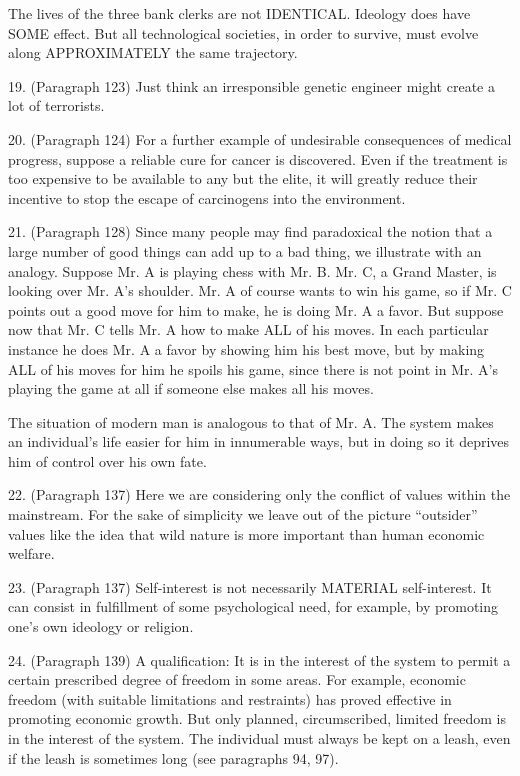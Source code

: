 The lives of the three bank clerks are not IDENTICAL. Ideology does have SOME effect. But all technological societies, in order to survive, must evolve along APPROXIMATELY the same trajectory.

19. (Paragraph 123) Just think an irresponsible genetic engineer might create a lot of terrorists.

20. (Paragraph 124) For a further example of undesirable consequences of medical progress, suppose a reliable cure for cancer is discovered. Even if the treatment is too expensive to be available to any but the elite, it will greatly reduce their incentive to stop the escape of carcinogens into the environment.

21. (Paragraph 128) Since many people may find paradoxical the notion that a large number of good things can add up to a bad thing, we illustrate with an analogy. Suppose Mr. A is playing chess with Mr. B. Mr. C, a Grand Master, is looking over Mr. A’s shoulder. Mr. A of course wants to win his game, so if Mr. C points out a good move for him to make, he is doing Mr. A a favor. But suppose now that Mr. C tells Mr. A how to make ALL of his moves. In each particular instance he does Mr. A a favor by showing him his best move, but by making ALL of his moves for him he spoils his game, since there is not point in Mr. A’s playing the game at all if someone else makes all his moves.

The situation of modern man is analogous to that of Mr. A. The system makes an individual’s life easier for him in innumerable ways, but in doing so it deprives him of control over his own fate.

22. (Paragraph 137) Here we are considering only the conflict of values within the mainstream. For the sake of simplicity we leave out of the picture “outsider” values like the idea that wild nature is more important than human economic welfare.

23. (Paragraph 137) Self-interest is not necessarily MATERIAL self-interest. It can consist in fulfillment of some psychological need, for example, by promoting one’s own ideology or religion.

24. (Paragraph 139) A qualification: It is in the interest of the system to permit a certain prescribed degree of freedom in some areas. For example, economic freedom (with suitable limitations and restraints) has proved effective in promoting economic growth. But only planned, circumscribed, limited freedom is in the interest of the system. The individual must always be kept on a leash, even if the leash is sometimes long (see paragraphs 94, 97).

